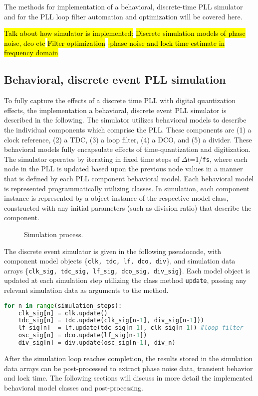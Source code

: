 The methods for implementation of a behavioral, discrete-time PLL simulator and for the PLL loop filter automation and optimization will be covered here.

\hl{Talk about how simulator is implemented:}
\hl{Discrete simulation models of phase noise, dco etc}
\hl{Filter optimization}
\hl{-phase noise and lock time estimate in frequency domain}

\subsection{Behavioral, discrete event PLL simulation}
To fully capture the effects of a discrete time PLL with digital quantization effects, the implementation a behavioral, discrete event PLL simulator is described in the following. The simulator utilizes behavioral models to describe the individual components which comprise the PLL. These components are (1) a clock reference, (2) a TDC, (3) a loop filter, (4) a DCO, and (5) a divider. These behavioral models fully encapsulate effects of time-quantization and digitization. The simulator operates by iterating in fixed time steps of $\Delta t$=1/\texttt{fs}, where each node in the PLL is updated based upon the previous node values in a manner that is defined by each PLL component behavioral model. Each behavioral model is represented programmatically utilizing classes. In simulation, each component instance is represented by a object instance of the respective model class, constructed with any initial parameters (such as division ratio) that describe the component.
\begin{figure}[htb!]
	\center
	\caption{Simulation process.}
	\label{fig:simulator}
\end{figure}
\FloatBarrier
The discrete event simulator is given in the following pseudocode, with component model objects \{\texttt{clk, tdc, lf, dco, div}\}, and simulation data arrays \{\texttt{clk\_sig, tdc\_sig, lf\_sig, dco\_sig, div\_sig}\}. Each model object is updated at each simulation step utilizing the class method \texttt{update}, passing any relevant simulation data as arguments to the method.

\begin{lstlisting}[language={Python}, caption={PLL simulation loop Python pseudocode}, label={sim_code}]
for n in range(simulation_steps):
    clk_sig[n] = clk.update()
    tdc_sig[n] = tdc.update(clk_sig[n-1], div_sig[n-1]))
    lf_sig[n]  = lf.update(tdc_sig[n-1], clk_sig[n-1]) #loop filter
    osc_sig[n] = dco.update(lf_sig[n-1])
    div_sig[n] = div.update(osc_sig[n-1], div_n)
    \end{lstlisting}
After the simulation loop reaches completion, the results stored in the simulation data arrays can be post-processed to extract phase noise data, transient behavior and lock time. The following sections will discuss in more detail the implemented behavioral model classes and post-processing.

